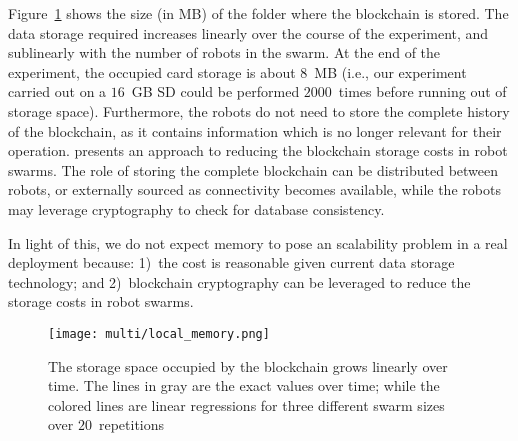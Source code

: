 \documentclass[runningheads]{llncs}
\begin{document}
Figure~\ref{fig:data-storage} shows the size (in MB) of the folder where the blockchain is stored. The data storage required increases linearly over the course of the experiment, and sublinearly with the number of robots in the swarm. At the end of the experiment, the occupied card storage is about $8$~MB (i.e., our experiment carried out on a $16$~GB SD could be performed $2000$~times before running out of storage space). Furthermore, the robots do not need to store the complete history of the blockchain, as it contains information which is no longer relevant for their operation. \cite{nishida_suppressing_2018} presents an approach to reducing the blockchain storage costs in robot swarms. The role of storing the complete blockchain can be distributed between robots, or externally sourced as connectivity becomes available, while the robots may leverage cryptography to check for database consistency.

In light of this, we do not expect memory to pose an scalability problem in a real deployment because: 1)~the cost is reasonable given current data storage technology; and 2)~blockchain cryptography can be leveraged to reduce the storage costs in robot swarms.

\begin{figure}
    \begin{minipage}[c]{0.5\textwidth}
        \texttt{[image: multi/local\_memory.png]}
    \end{minipage}\hfill
    \begin{minipage}[c]{0.48\textwidth}
        \caption{The storage space occupied by the blockchain grows linearly over time. The lines in gray are the exact values over time; while the colored lines are linear regressions for three different swarm sizes over $20$~repetitions} 
        \label{fig:data-storage}
    \end{minipage}
\end{figure}




\end{document}
